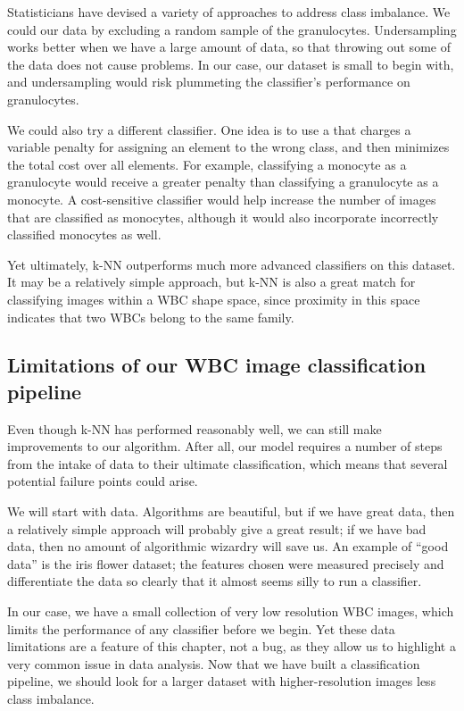 Statisticians have devised a variety of approaches to address class imbalance. We could  our data by excluding a random sample of the granulocytes. Undersampling works better when we have a large amount of data, so that throwing out some of the data does not cause problems. In our case, our dataset is small to begin with, and undersampling would risk plummeting the classifier's performance on granulocytes.

We could also try a different classifier. One idea is to use a  that charges a variable penalty for assigning an element to the wrong class, and then minimizes the total cost over all elements. For example, classifying a monocyte as a granulocyte would receive a greater penalty than classifying a granulocyte as a monocyte. A cost-sensitive classifier would help increase the number of images that are classified as monocytes, although it would also incorporate incorrectly classified monocytes as well.

Yet ultimately, k-NN outperforms much more advanced classifiers on this dataset. It may be a relatively simple approach, but k-NN is also a great match for classifying images within a WBC shape space, since proximity in this space indicates that two WBCs belong to the same family.

\FloatBarrier
{}
\subsection{Limitations of our WBC image classification pipeline}

Even though k-NN has performed reasonably well, we can still make improvements to our algorithm. After all, our model requires a number of steps from the intake of data to their ultimate classification, which means that several potential failure points could arise.

We will start with data. Algorithms are beautiful, but if we have great data, then a relatively simple approach will probably give a great result; if we have bad data, then no amount of algorithmic wizardry will save us. An example of ``good data'' is the iris flower dataset; the features chosen were measured precisely and differentiate the data so clearly that it almost seems silly to run a classifier.

In our case, we have a small collection of very low resolution WBC images, which limits the performance of any classifier before we begin. Yet these data limitations are a feature of this chapter, not a bug, as they allow us to highlight a very common issue in data analysis. Now that we have built a classification pipeline, we should look for a larger dataset with higher-resolution images less class imbalance.

